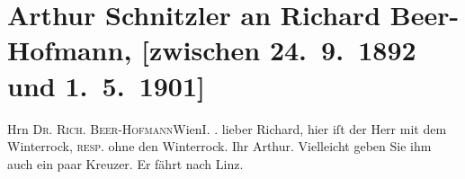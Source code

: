 

         
         \renewcommand{\erwaehntePersonen}{Personen:  ?? [Mann ohne Winterrock], Richard Beer-Hofmann}
         \renewcommand{\erwaehnteOrte}{Orte: Linz, Wien, Wollzeile}
         \renewcommand{\erwaehnteWerke}{}
               \section[Arthur Schnitzler an Richard Beer-Hofmann, {[}zwischen 24. 9. 1892 und 1. 5. 1901{]}]{ Arthur Schnitzler an Richard Beer-Hofmann, {[}zwischen 24. 9. 1892 und
               1. 5. 1901{]}}\nopagebreak{}\rehead{ }\begin{ledgroupsized}[t]{13cm}\normalsize\beginnumbering \toendnotes[C]{\smallbreak\pagebreak[2]} 
\toendnotes[C]{\smallbreak}\pstart{}{\pb}Hrn \textsc{Dr. Rich.
                     Beer-Hofmann}\pend{}\pstart{}Wien\pend{}\pstart{}\textsc{I. \label{K_L00120_1v}\label{K_L00120_1h}.}\pend{}{\bigskip}\pstart
           \noindent{}{\pb}lieber Richard,  hier iſt der Herr mit dem Winterrock, \textsc{resp.}
               ohne den Winterrock.\pend
           \pstart Ihr \spacefill\mbox{Arthur.}\pend{}\pstart
           \noindent{}{\pb}Vielleicht geben Sie ihm auch ein paar Kreuzer. Er
                  fährt nach Linz.\pend
           
         
         \endnumbering{}\end{ledgroupsized}  \newcommand{\dateiname}{L00120}\newcommand{\titel}{Arthur Schnitzler an Richard Beer-Hofmann, [zwischen 24. 9. 1892 und 1. 5. 1901]}\newcommand{\editorInnen}{Martin Anton Müller und Gerd-Hermann Susen}
      